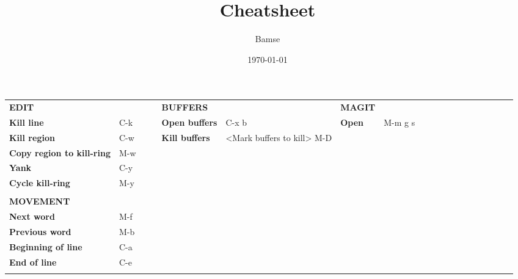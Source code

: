 \documentclass[landscape]{article}
\author{Bamse}
\date{\today}
\title{Cheatsheet}
\begin{document}
\begin{center}
\begin{tabular}{lllllllllllllllllll}
\textbf{EDIT} &  &  &  & \textbf{BUFFERS} &  & \textbf{MAGIT} &  &  &  &  &  &  &  &  &  &  &  & \\
\textbf{Kill line} & C-k &  &  & \textbf{Open buffers} & C-x b & \textbf{Open} & M-m g s &  &  &  &  &  &  &  &  &  &  & \\
\textbf{Kill region} & C-w &  &  & \textbf{Kill buffers} & <Mark buffers to kill> M-D &  &  &  &  &  &  &  &  &  &  &  &  & \\
\textbf{Copy region to kill-ring} & M-w &  &  &  &  &  &  &  &  &  &  &  &  &  &  &  &  & \\
\textbf{Yank} & C-y &  &  &  &  &  &  &  &  &  &  &  &  &  &  &  &  & \\
\textbf{Cycle kill-ring} & M-y &  &  &  &  &  &  &  &  &  &  &  &  &  &  &  &  & \\
 &  &  &  &  &  &  &  &  &  &  &  &  &  &  &  &  &  & \\
\textbf{MOVEMENT} &  &  &  &  &  &  &  &  &  &  &  &  &  &  &  &  &  & \\
\textbf{Next word} & M-f &  &  &  &  &  &  &  &  &  &  &  &  &  &  &  &  & \\
\textbf{Previous word} & M-b &  &  &  &  &  &  &  &  &  &  &  &  &  &  &  &  & \\
\textbf{Beginning of line} & C-a &  &  &  &  &  &  &  &  &  &  &  &  &  &  &  &  & \\
\textbf{End of line} & C-e &  &  &  &  &  &  &  &  &  &  &  &  &  &  &  &  & \\
 &  &  &  &  &  &  &  &  &  &  &  &  &  &  &  &  &  & \\
\end{tabular}
\end{center}
\end{document}
